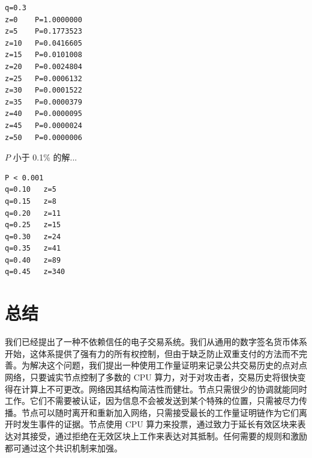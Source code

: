 \documentclass{article}
\begin{document}
\begin{lstlisting}
q=0.3
z=0    P=1.0000000
z=5    P=0.1773523
z=10   P=0.0416605
z=15   P=0.0101008
z=20   P=0.0024804
z=25   P=0.0006132
z=30   P=0.0001522
z=35   P=0.0000379
z=40   P=0.0000095
z=45   P=0.0000024
z=50   P=0.0000006
\end{lstlisting}

$P$ 小于 0.1\% 的解...

\begin{lstlisting}
P < 0.001
q=0.10   z=5
q=0.15   z=8
q=0.20   z=11
q=0.25   z=15
q=0.30   z=24
q=0.35   z=41
q=0.40   z=89
q=0.45   z=340
\end{lstlisting}

\section{总结}

我们已经提出了一种不依赖信任的电子交易系统。我们从通用的数字签名货币体系开始，这体系提供了强有力的所有权控制，但由于缺乏防止双重支付的方法而不完善。为解决这个问题，我们提出一种使用工作量证明来记录公共交易历史的点对点网络，只要诚实节点控制了多数的 CPU 算力，对于对攻击者，交易历史将很快变得在计算上不可更改。网络因其结构简洁性而健壮。节点只需很少的协调就能同时工作。它们不需要被认证，因为信息不会被发送到某个特殊的位置，只需被尽力传播。节点可以随时离开和重新加入网络，只需接受最长的工作量证明链作为它们离开时发生事件的证据。节点使用 CPU 算力来投票，通过致力于延长有效区块来表达对其接受，通过拒绝在无效区块上工作来表达对其抵制。任何需要的规则和激励都可通过这个共识机制来加强。


\end{document}
